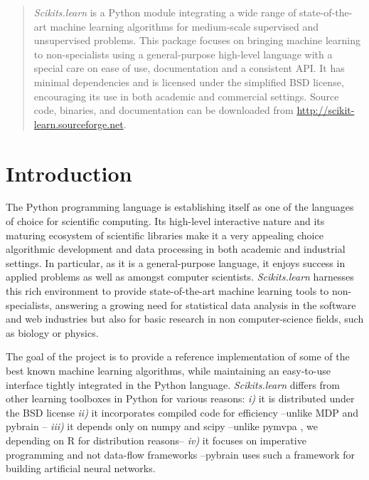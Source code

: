 \documentclass[twoside,11pt]{article}
\begin{document}
\maketitle

\begin{abstract}
\emph{Scikits.learn} is a Python module integrating
a wide range of state-of-the-art machine learning algorithms for
medium-scale supervised and unsupervised problems. This package
focuses on bringing machine learning to non-specialists using a
general-purpose high-level language with a special care on ease of use,
documentation and a consistent API.
%
It has minimal dependencies and is licensed under the simplified BSD
license, encouraging its use in both academic and commercial settings. Source
code, binaries, and documentation can be downloaded from
\url{http://scikit-learn.sourceforge.net}.

\end{abstract}





\section{Introduction}

The Python programming language is establishing itself as one of the
languages of choice for scientific computing. Its high-level interactive
nature and its maturing ecosystem of scientific libraries
\citep{cise2007,cise2011} make it a very appealing choice algorithmic
development and data processing in both academic and industrial settings.
In particular, as it is a general-purpose language, it enjoys success in
applied problems as well as amongst computer scientists.
%
{\sl Scikits.learn} harnesses this rich environment to provide
state-of-the-art machine learning tools to non-specialists, answering a
growing need for statistical data analysis in the software and web
industries but also for basic research in non computer-science fields,
such as biology or physics.

The goal of the project is to provide a reference implementation of some
of the best known machine learning algorithms, while maintaining an
easy-to-use interface tightly integrated in the Python language.
\emph{Scikits.learn} differs from other learning toolboxes in Python for
various reasons: \emph{i)} it is distributed under the BSD license
\emph{ii)} it incorporates compiled code for efficiency --unlike MDP
\citep{zito2008} and pybrain \citep{schaul2010}-- \emph{iii)} it depends
only on numpy and scipy --unlike pymvpa \citep{hanke2009}, we depending
on R for distribution reasons-- \emph{iv)} it focuses on imperative
programming and not data-flow frameworks --pybrain uses such a framework
for building artificial neural networks.
\end{document}
